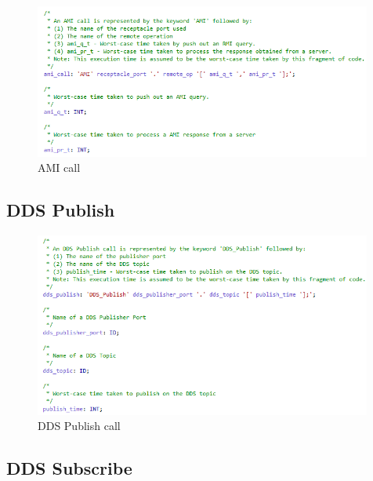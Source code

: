 \begin{figure}[ht]
\centering
\includegraphics[width=0.99\textwidth]{./figs/Grammar_4}
\caption{AMI call}
\label{fig:grammar4}
\vspace{-0.2in}
\end{figure}
\vspace{0.1in}

\subsection{DDS Publish}

\begin{figure}[ht]
\centering
\includegraphics[width=0.99\textwidth]{./figs/Grammar_5}
\caption{DDS Publish call}
\label{fig:grammar5}
\vspace{-0.2in}
\end{figure}
\vspace{0.1in}

\newpage

\subsection{DDS Subscribe}

